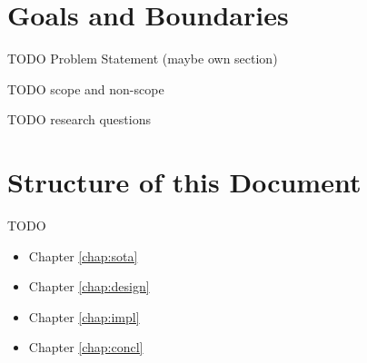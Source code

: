 \section{Goals and Boundaries}

TODO Problem Statement (maybe own section)

TODO scope and non-scope

TODO research questions

\section{Structure of this Document}

TODO

\begin{itemize}
    \item Chapter \ref{chap:sota}
    \item Chapter \ref{chap:design}
    \item Chapter \ref{chap:impl}
    \item Chapter \ref{chap:concl}
\end{itemize}